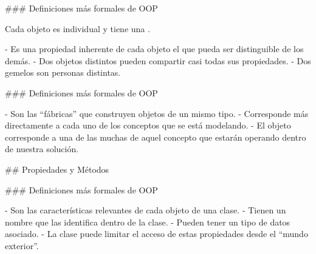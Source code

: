 ### Definiciones más formales de OOP

\newline

Cada objeto es individual y tiene una .\newline

- Es una propiedad inherente de cada objeto el que pueda ser distinguible de los demás.
- Dos objetos distintos pueden compartir casi todas sus propiedades.
    - Dos gemelos son personas distintas.


### Definiciones más formales de OOP


- Son las ``fábricas'' que construyen objetos de un mismo tipo.
- Corresponde más directamente a cada uno de los conceptos que se está modelando.
    - El objeto corresponde a una de las muchas  de aquel concepto
    que estarán operando dentro de nuestra solución.

\centering{}

## Propiedades y Métodos

### Definiciones más formales de OOP


- Son las características relevantes de cada objeto de una clase.
- Tienen un nombre que las identifica dentro de la clase.
- Pueden tener un tipo de datos asociado.
- La clase puede limitar el acceso de estas propiedades desde el ``mundo exterior''.

\centering{}

